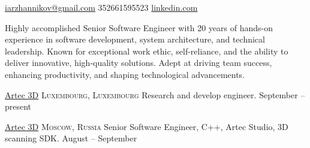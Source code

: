 \documentclass[10pt,a4paper]{article}
\begin{document}
\sloppy  %



\nobreakvspace{0.3em}  %

\noindent\href{mailto:iarzhannikov@gmail.com}{iarzhannikov\mbox{}@\mbox{}gmail.com}\sbull
\textsmaller{+}352661595523\sbull
\href{https://www.linkedin.com/in/arzhannikov-ilya-8a125b37/?locale=en_US}{linkedin.com}

\spacedhrule{0.9em}{-0.4em}  %


\vspace{-1.3em}  %
\begin{multicols}{2}  %
\noindent
Highly accomplished Senior Software Engineer with 20 years of hands-on experience in software development, system architecture, and technical leadership. Known for exceptional work ethic, self-reliance, and the ability to deliver innovative, high-quality solutions. Adept at driving team success, enhancing productivity, and shaping technological advancements.
\end{multicols}


\spacedhrule{0em}{-0.4em}


\headedsection
  {\href{https://www.artec3d.com/}{Artec 3D}}
  {\textsc{Luxembourg, Luxembourg}} {%
  \headedsubsection
    {Research and develop engineer.}
    {September  -- present}
    {}
}

\headedsection
  {\href{https://www.artec3d.com/}{Artec 3D}}
  {\textsc{Moscow, Russia}} {%
  \headedsubsection
    {Senior Software Engineer, C++, Artec Studio, 3D scanning SDK.}
    {August  -- September }
    {}
}
\end{document}
